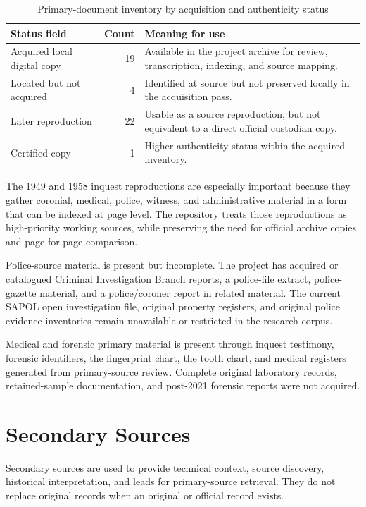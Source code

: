 \begin{table}[htbp]
\centering
\caption{Primary-document inventory by acquisition and authenticity status}
\label{tab:sources-primary-document-status}
\begin{tabularx}{\textwidth}{p{}rX}
\toprule
Status field & Count & Meaning for use \\
\midrule
Acquired local digital copy & 19 & Available in the project archive for review, transcription, indexing, and source mapping. \\
Located but not acquired & 4 & Identified at source but not preserved locally in the acquisition pass. \\
Later reproduction & 22 & Usable as a source reproduction, but not equivalent to a direct official custodian copy. \\
Certified copy & 1 & Higher authenticity status within the acquired inventory. \\
\bottomrule
\end{tabularx}
\end{table}

The 1949 and 1958 inquest reproductions are especially important because they gather coronial, medical, police, witness, and administrative material in a form that can be indexed at page level. The repository treats those reproductions as high-priority working sources, while preserving the need for official archive copies and page-for-page comparison.

Police-source material is present but incomplete. The project has acquired or catalogued Criminal Investigation Branch reports, a police-file extract, police-gazette material, and a police/coroner report in related material. The current SAPOL open investigation file, original property registers, and original police evidence inventories remain unavailable or restricted in the research corpus.

Medical and forensic primary material is present through inquest testimony, forensic identifiers, the fingerprint chart, the tooth chart, and medical registers generated from primary-source review. Complete original laboratory records, retained-sample documentation, and post-2021 forensic reports were not acquired.

\section{Secondary Sources}

Secondary sources are used to provide technical context, source discovery, historical interpretation, and leads for primary-source retrieval. They do not replace original records when an original or official record exists.

